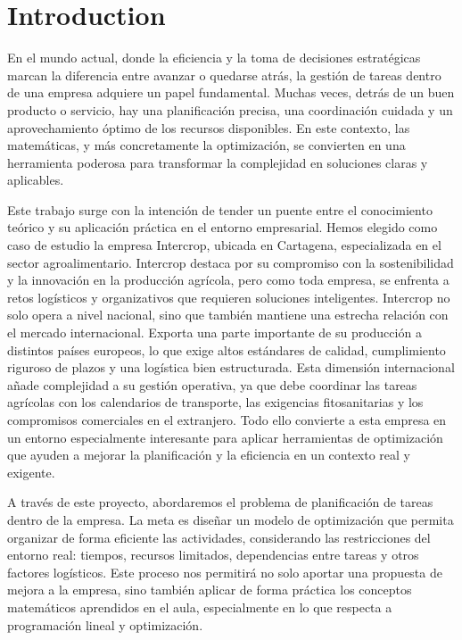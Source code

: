 \chapter*{Introduction}

En el mundo actual, donde la eficiencia y la toma de decisiones estratégicas marcan la diferencia entre avanzar o quedarse atrás, la gestión de tareas dentro de una empresa adquiere un papel fundamental.
Muchas veces, detrás de un buen producto o servicio, hay una planificación precisa, una coordinación cuidada y un aprovechamiento óptimo de los recursos disponibles.
En este contexto, las matemáticas, y más concretamente la optimización, se convierten en una herramienta poderosa para transformar la complejidad en soluciones claras y aplicables.

Este trabajo surge con la intención de tender un puente entre el conocimiento teórico y su aplicación práctica en el entorno empresarial.
Hemos elegido como caso de estudio la empresa Intercrop, ubicada en Cartagena, especializada en el sector agroalimentario.
Intercrop destaca por su compromiso con la sostenibilidad y la innovación en la producción agrícola, pero como toda empresa, se enfrenta a retos logísticos y organizativos que requieren soluciones inteligentes.
Intercrop no solo opera a nivel nacional, sino que también mantiene una estrecha relación con el mercado internacional. 
Exporta una parte importante de su producción a distintos países europeos, lo que exige altos estándares de calidad, cumplimiento riguroso de plazos y una logística bien estructurada.
Esta dimensión internacional añade complejidad a su gestión operativa, ya que debe coordinar las tareas agrícolas con los calendarios de transporte, las exigencias fitosanitarias y los compromisos comerciales en el extranjero.
Todo ello convierte a esta empresa en un entorno especialmente interesante para aplicar herramientas de optimización que ayuden a mejorar la planificación y la eficiencia en un contexto real y exigente.

A través de este proyecto, abordaremos el problema de planificación de tareas dentro de la empresa. La meta es diseñar un modelo de optimización que permita organizar de forma eficiente las actividades,
 considerando las restricciones del entorno real: tiempos, recursos limitados, dependencias entre tareas y otros factores logísticos.
Este proceso nos permitirá no solo aportar una propuesta de mejora a la empresa, sino también aplicar de forma práctica los conceptos matemáticos aprendidos en el aula, especialmente en lo que respecta a programación lineal y optimización.

